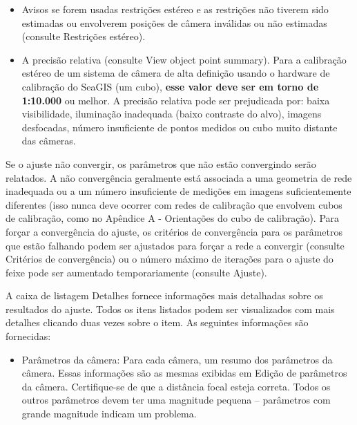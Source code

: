 \documentclass[
  12pt,
  letterpaper,
  DIV=11,
  numbers=noendperiod]{scrreprt}
\providecommand{\tightlist}{%
  \setlength{\itemsep}{0pt}\setlength{\parskip}{0pt}}
\begin{document}
\begin{itemize}
\tightlist
\item
  Avisos se forem usadas restrições estéreo e as restrições não tiverem
  sido estimadas ou envolverem posições de câmera inválidas ou não
  estimadas (consulte Restrições estéreo).
\end{itemize}

\begin{itemize}
\tightlist
\item
  A precisão relativa (consulte View object point summary). Para a
  calibração estéreo de um sistema de câmera de alta definição usando o
  hardware de calibração do SeaGIS (um cubo), \textbf{esse valor deve
  ser em torno de 1:10.000} ou melhor. A precisão relativa pode ser
  prejudicada por: baixa visibilidade, iluminação inadequada (baixo
  contraste do alvo), imagens desfocadas, número insuficiente de pontos
  medidos ou cubo muito distante das câmeras.
\end{itemize}

Se o ajuste não convergir, os parâmetros que não estão convergindo serão
relatados. A não convergência geralmente está associada a uma geometria
de rede inadequada ou a um número insuficiente de medições em imagens
suficientemente diferentes (isso nunca deve ocorrer com redes de
calibração que envolvem cubos de calibração, como no Apêndice A -
Orientações do cubo de calibração). Para forçar a convergência do
ajuste, os critérios de convergência para os parâmetros que estão
falhando podem ser ajustados para forçar a rede a convergir (consulte
Critérios de convergência) ou o número máximo de iterações para o ajuste
do feixe pode ser aumentado temporariamente (consulte Ajuste).

A caixa de listagem Detalhes fornece informações mais detalhadas sobre
os resultados do ajuste. Todos os itens listados podem ser visualizados
com mais detalhes clicando duas vezes sobre o item. As seguintes
informações são fornecidas:

\begin{itemize}
\tightlist
\item
  Parâmetros da câmera: Para cada câmera, um resumo dos parâmetros da
  câmera. Essas informações são as mesmas exibidas em Edição de
  parâmetros da câmera. Certifique-se de que a distância focal esteja
  correta. Todos os outros parâmetros devem ter uma magnitude pequena --
  parâmetros com grande magnitude indicam um problema.
\end{itemize}
\end{document}
